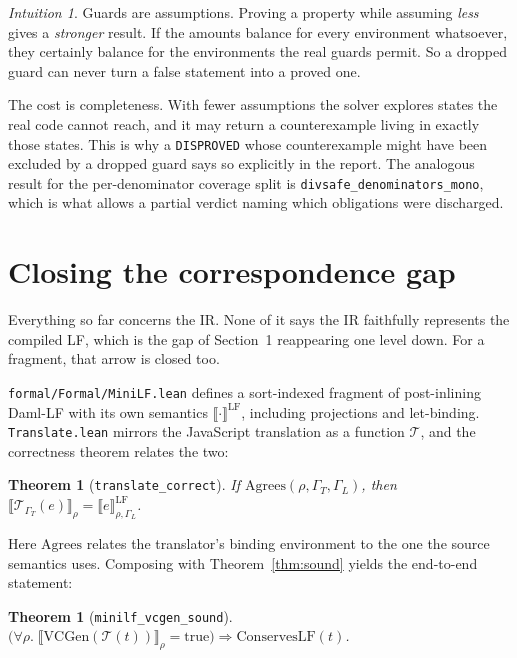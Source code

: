 \documentclass[11pt,a4paper]{article}
\newcommand{\sem}[1]{\llbracket #1 \rrbracket}
\newcommand{\seme}[2]{\llbracket #1 \rrbracket_{#2}}
\newcommand{\VC}{\mathrm{VCGen}}
\newcommand{\code}[1]{\texttt{#1}}
\theoremstyle{definition}
\theoremstyle{plain}
\newtheorem{theorem}[definition]{Theorem}
\theoremstyle{remark}
\newtheorem*{intuition}{Intuition}
\begin{document}
\begin{intuition}
Guards are assumptions. Proving a property while assuming \emph{less} gives a
\emph{stronger} result. If the amounts balance for every environment
whatsoever, they certainly balance for the environments the real guards permit.
So a dropped guard can never turn a false statement into a proved one.
\end{intuition}

The cost is completeness. With fewer assumptions the solver explores states the
real code cannot reach, and it may return a counterexample living in exactly
those states. This is why a \code{DISPROVED} whose counterexample might have
been excluded by a dropped guard says so explicitly in the report. The
analogous result for the per-denominator coverage split is
\code{divsafe\_denominators\_mono}, which is what allows a partial verdict
naming which obligations were discharged.

\section{Closing the correspondence gap}
\label{sec:gap}

Everything so far concerns the IR. None of it says the IR faithfully represents
the compiled LF, which is the gap of Section~1 reappearing one level down. For
a fragment, that arrow is closed too.

\code{formal/Formal/MiniLF.lean} defines a sort-indexed fragment of
post-inlining Daml-LF with its own semantics $\sem{\cdot}^{\mathrm{LF}}$,
including projections and let-binding. \code{Translate.lean} mirrors the
JavaScript translation as a function $\mathcal{T}$, and the correctness theorem
relates the two:

\begin{theorem}[\code{translate\_correct}]
If $\mathrm{Agrees}(\rho, \Gamma_T, \Gamma_L)$, then
$\seme{\mathcal{T}_{\Gamma_T}(e)}{\rho} = \sem{e}^{\mathrm{LF}}_{\rho,\Gamma_L}$.
\end{theorem}

\noindent
Here $\mathrm{Agrees}$ relates the translator's binding environment to the one
the source semantics uses. Composing with Theorem~\ref{thm:sound} yields the
end-to-end statement:

\begin{theorem}[\code{minilf\_vcgen\_sound}]
$\bigl(\forall \rho.\; \seme{\VC(\mathcal{T}(t))}{\rho} = \text{true}\bigr)
 \Longrightarrow \mathrm{ConservesLF}(t)$.
\end{theorem}
\end{document}
